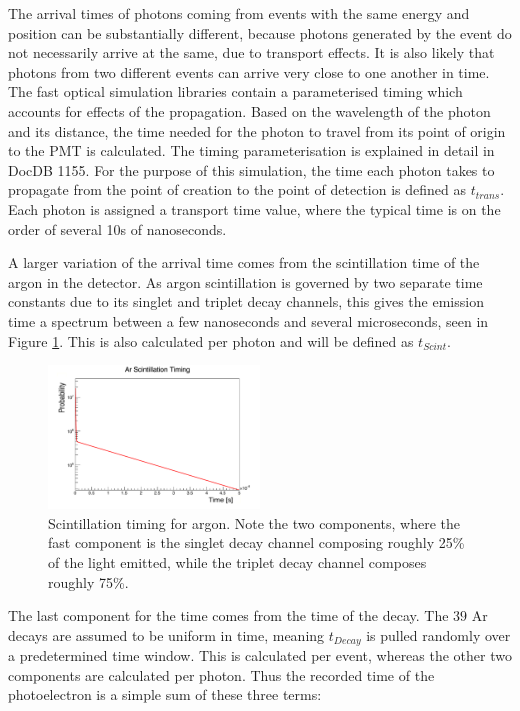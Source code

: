 \documentclass[a4paper]{article}
\begin{document}
The arrival times of photons coming from events with the same energy and position can be substantially different, because photons generated by the event do not necessarily arrive at the same, due to transport effects. It is also likely that photons from two different events can arrive very close to one another in time. The fast optical simulation libraries contain a parameterised timing which accounts for effects of the propagation. Based on the wavelength of the photon and its distance, the time needed for the photon to travel from its point of origin to the PMT is calculated. The timing parameterisation is explained in detail in DocDB 1155. For the purpose of this simulation, the time each photon takes to propagate from the point of creation to the point of detection is defined as $t_{trans}$. Each photon is assigned a transport time value, where the typical time is on the order of several 10s of nanoseconds.

A larger variation of the arrival time comes from the scintillation time of the argon in the detector. As argon scintillation is governed by two separate time constants due to its singlet and triplet decay channels, this gives the emission time a spectrum between a few nanoseconds and several microseconds, seen in Figure \ref{ar40_scint}. This is also calculated per photon and will be defined as $t_{Scint}$.

\begin{figure}[H]
\center
\includegraphics[width=0.5\textwidth]{ar40_scintillation_timing_larger.pdf}
\caption{Scintillation timing for argon. Note the two components, where the fast component is the singlet decay channel composing roughly 25\% of the light emitted, while the triplet decay channel composes roughly 75\%.}\label{ar40_scint}
\end{figure}

The last component for the time comes from the time of the decay. The ${39}$ Ar decays are assumed to be uniform in time, meaning $t_{Decay}$ is pulled randomly over a predetermined time window. This is calculated per event, whereas the other two components are calculated per photon. Thus the recorded time of the photoelectron is a simple sum of these three terms:
\end{document}
